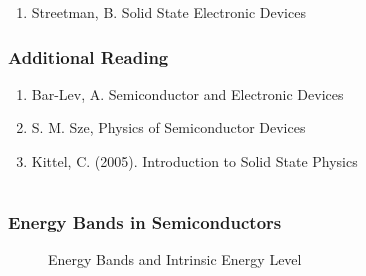 \documentclass[titlepage, fleqn, a4paper, 12pt, twoside]{article}
\theoremstyle{definition}
\theoremstyle{theorem}
\begin{document}
\begin{enumerate}
	\item Streetman, B. Solid State Electronic Devices
\end{enumerate}

\section{Additional Reading}

\begin{enumerate}
	\item Bar-Lev, A. Semiconductor and Electronic Devices
	\item S. M. Sze, Physics of Semiconductor Devices
	\item Kittel, C. (2005). Introduction to Solid State Physics
\end{enumerate}

\clearpage
{}

\part{}

\section{Energy Bands in Semiconductors}

\begin{figure}[h]
	\centering
	\caption{Energy Bands and Intrinsic Energy Level}
	\label{fig:Energy_Bands_and_Intrinsic_Energy_Level}
\end{figure}
\end{document}
